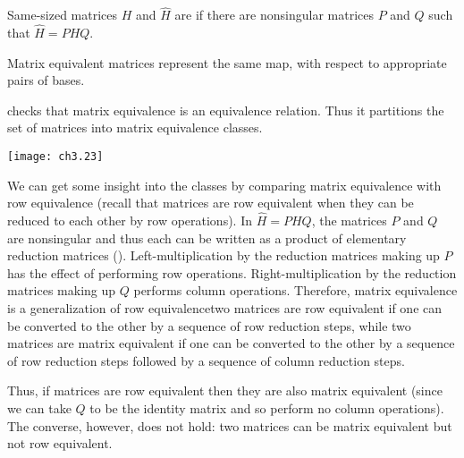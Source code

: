 \begin{definition}
\label{def:MatEquiv}
Same-sized matrices \( H \) and \( \hat{H} \) are
%
if there are nonsingular matrices \( P \) and \( Q \) such that
$\hat{H}=PHQ$.
\end{definition}

\begin{corollary}
\label{le:MatEqIsSameMap}
Matrix equivalent matrices represent the same map, with respect to appropriate
pairs of bases.
\end{corollary}

 checks that
matrix equivalence is an equivalence relation.
Thus it  partitions 
the set of matrices into matrix equivalence classes.
\begin{center}
  \texttt{[image: ch3.23]}
\end{center}
We can get some insight into the classes by comparing matrix equivalence
with row equivalence
(recall that matrices are row equivalent when they can be reduced to each
other by row operations).
In $\hat{H}=PHQ$, the matrices $P$ and $Q$ are nonsingular and 
thus each can be written as a product of elementary reduction matrices
().
Left-multiplication by the reduction matrices making up $P$
has the effect of performing row operations.
Right-multiplication by the reduction matrices making up $Q$
performs column operations.
Therefore, matrix equivalence is a generalization of row equivalence\Dash two
matrices are row equivalent if one can be converted to the other by
a sequence of row reduction steps, while
two matrices are matrix equivalent if one can be converted to the other by a 
sequence of row reduction steps followed by a sequence of column reduction
steps. 

Thus, if matrices are row equivalent then they are also
matrix equivalent (since we can take $Q$ to be the identity matrix and so 
perform no column operations).
The converse, however, does not hold:
two matrices can be matrix equivalent but not row equivalent.


